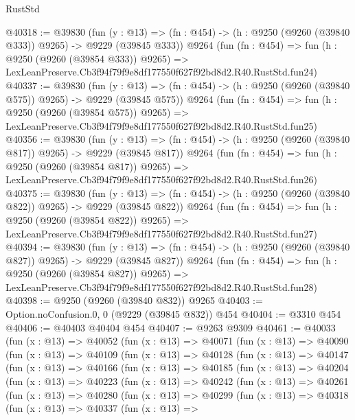 \begin{lexlean}{RustStd}
\begin{coremodule}
@40318 := @39830
    (fun (y : @13) => (fn : @454) -> (h : @9250 (@9260 (@39840 @333)) @9265) -> @9229 (@39845 @333))
    @9264
    (fun (fn : @454) =>
    fun (h : @9250 (@9260 (@39854 @333)) @9265) =>
    LexLeanPreserve.Cb3f94f79f9e8df177550f627f92bd8d2.R40.RustStd.fun24)
@40337 := @39830
    (fun (y : @13) => (fn : @454) -> (h : @9250 (@9260 (@39840 @575)) @9265) -> @9229 (@39845 @575))
    @9264
    (fun (fn : @454) =>
    fun (h : @9250 (@9260 (@39854 @575)) @9265) =>
    LexLeanPreserve.Cb3f94f79f9e8df177550f627f92bd8d2.R40.RustStd.fun25)
@40356 := @39830
    (fun (y : @13) => (fn : @454) -> (h : @9250 (@9260 (@39840 @817)) @9265) -> @9229 (@39845 @817))
    @9264
    (fun (fn : @454) =>
    fun (h : @9250 (@9260 (@39854 @817)) @9265) =>
    LexLeanPreserve.Cb3f94f79f9e8df177550f627f92bd8d2.R40.RustStd.fun26)
@40375 := @39830
    (fun (y : @13) => (fn : @454) -> (h : @9250 (@9260 (@39840 @822)) @9265) -> @9229 (@39845 @822))
    @9264
    (fun (fn : @454) =>
    fun (h : @9250 (@9260 (@39854 @822)) @9265) =>
    LexLeanPreserve.Cb3f94f79f9e8df177550f627f92bd8d2.R40.RustStd.fun27)
@40394 := @39830
    (fun (y : @13) => (fn : @454) -> (h : @9250 (@9260 (@39840 @827)) @9265) -> @9229 (@39845 @827))
    @9264
    (fun (fn : @454) =>
    fun (h : @9250 (@9260 (@39854 @827)) @9265) =>
    LexLeanPreserve.Cb3f94f79f9e8df177550f627f92bd8d2.R40.RustStd.fun28)
@40398 := @9250 (@9260 (@39840 @832)) @9265
@40403 := Option.noConfusion.{0, 0} (@9229 (@39845 @832)) @454
@40404 := @3310 @454
@40406 := @40403 @40404 @454
@40407 := @9263 @9309
@40461 := @40033
    (fun (x : @13) =>
    @40052
      (fun (x : @13) =>
      @40071
        (fun (x : @13) =>
        @40090
          (fun (x : @13) =>
          @40109
            (fun (x : @13) =>
            @40128
              (fun (x : @13) =>
              @40147
                (fun (x : @13) =>
                @40166
                  (fun (x : @13) =>
                  @40185
                    (fun (x : @13) =>
                    @40204
                      (fun (x : @13) =>
                      @40223
                        (fun (x : @13) =>
                        @40242
                          (fun (x : @13) =>
                          @40261
                            (fun (x : @13) =>
                            @40280
                              (fun (x : @13) =>
                              @40299
                                (fun (x : @13) =>
                                @40318
                                  (fun (x : @13) =>
                                  @40337
                                    (fun (x : @13) =>

\end{coremodule}
\end{lexlean}
